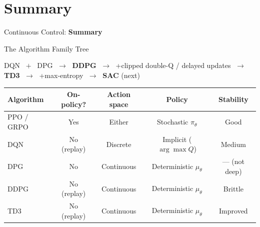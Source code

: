 \section{Summary}
\begin{frame}{}
    \LARGE Continuous Control: \textbf{Summary}
\end{frame}

\begin{frame}{The Algorithm Family Tree}
\begin{center}
DQN $\;+\;$ DPG $\;\rightarrow\;$ \textbf{DDPG} $\;\rightarrow\;$ +clipped double-Q / delayed updates $\;\rightarrow\;$ \textbf{TD3} $\;\rightarrow\;$ +max-entropy $\;\rightarrow\;$ \textbf{SAC} (next)
\end{center}

\vspace{0.6em}

\begin{table}[]
    \centering
    \renewcommand{\arraystretch}{1.8}
    \small
    \begin{tabular}{lcccc}
        \hline
        \textbf{Algorithm} & \textbf{On-policy?} & \textbf{Action space} & \textbf{Policy} & \textbf{Stability} \\
        \hline
        PPO / GRPO & Yes         & Either              & Stochastic $\pi_\theta$ & Good \\
        DQN   & No (replay) & Discrete            & Implicit ($\arg\max Q$) & Medium \\
        DPG   & No          & Continuous          & Deterministic $\mu_\theta$ & --- (not deep) \\
        DDPG  & No (replay) & Continuous          & Deterministic $\mu_\theta$ & Brittle \\
        TD3   & No (replay) & Continuous          & Deterministic $\mu_\theta$ & Improved \\
        \hline
    \end{tabular}
\end{table}
\end{frame}

